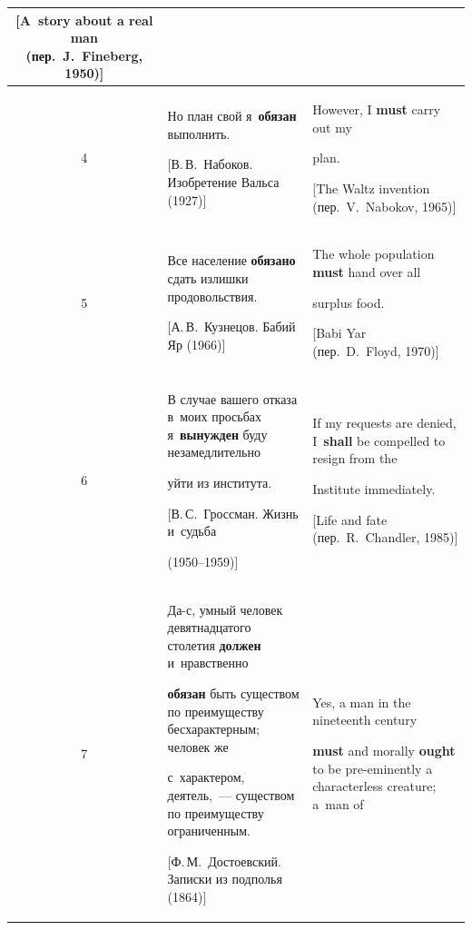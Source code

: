 \begin{table}
\begin{center}
\begin{tabular}{|c|p{57mm}|p{57mm}|}
[A~story about a real man (пер.\ J.~Fineberg, 1950)]\\


\hline


4&Но план свой я~\textbf{обязан} выполнить.\newline


[В.\,В.~Набоков. Изобретение Вальса (1927)]&However, I \textbf{must} carry out my 


plan.\newline


[The Waltz invention (пер.\ V.~Nabokov, 1965)]\\


\hline


5&Все население \textbf{обязано} сдать излишки продовольствия.\newline


[А.\,В.~Кузнецов. Бабий Яр (1966)]&The whole population \textbf{must} hand over all 


surplus food.\newline


[Babi Yar (пер.\ D.~Floyd, 1970)]\\


\hline


6&В случае вашего отказа в~моих просьбах я~\textbf{вынужден} буду незамедлительно 


уйти из института.\newline


[В.\,С.~Гроссман. Жизнь и~судьба  


(1950--1959)]&If my requests are denied, I~\textbf{shall} be compelled to resign from the 


Institute immediately.\newline


[Life and fate (пер.\ R.~Chandler, 1985)]\\


\hline


7&Да-с, умный человек девятнадцатого столетия \textbf{должен} и~нравственно 


\textbf{обязан} быть существом по преимуществу бесхарактерным; человек же 


с~характером, деятель,~--- существом по преимуществу ограниченным.\newline


[Ф.\,М.~Достоевский. Записки из подполья (1864)]&Yes, a man in the nineteenth century 


\textbf{must} and morally \textbf{ought} to be pre-eminently a characterless creature; a~man of 



\end{tabular}
\end{center}
\end{table}
